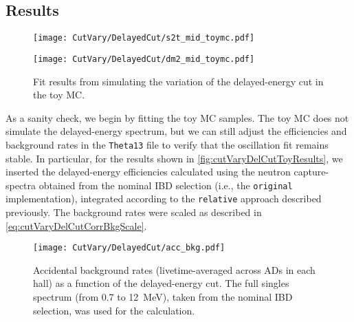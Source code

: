 \documentclass[../thesis.tex]{subfiles}
\begin{document}
\begin{comment}
In most of the results that follow, we show the outcome of using the \texttt{original} method, but the other methods give the same results. When we later discuss the application of vertex cuts, we will switch to the \texttt{add-then-calc} method (and will show the difficulties that result when attempting to use the \texttt{original} method).
\end{comment}

\subsection{Results}
\label{sec:cutVaryDelCutResults}

\begin{figure}[ht]
  \begin{minipage}{0.5\linewidth}%
    \texttt{[image: CutVary/DelayedCut/s2t\_mid\_toymc.pdf]}%
  \end{minipage}%
  \begin{minipage}{0.5\linewidth}%
    \texttt{[image: CutVary/DelayedCut/dm2\_mid\_toymc.pdf]}%
  \end{minipage}%
  \caption{Fit results from simulating the variation of the delayed-energy cut in the toy MC.}
  \label{fig:cutVaryDelCutToyResults}
\end{figure}

As a sanity check, we begin by fitting the toy MC samples. The toy MC does not simulate the delayed-energy spectrum, but we can still adjust the efficiencies and background rates in the \texttt{Theta13} file to verify that the oscillation fit remains stable. In particular, for the results shown in \autoref{fig:cutVaryDelCutToyResults}, we inserted the delayed-energy efficiencies calculated using the neutron capture-spectra obtained from the nominal IBD selection (i.e., the \texttt{original} implementation), integrated according to the \texttt{relative} approach described previously.
The background rates were scaled as described in \autoref{eq:cutVaryDelCutCorrBkgScale}.

\begin{figure}[ht]
  \texttt{[image: CutVary/DelayedCut/acc\_bkg.pdf]}
  \caption{Accidental background rates (livetime-averaged across ADs in each hall) as a function of the delayed-energy cut. The full singles spectrum (from 0.7 to 12~MeV), taken from the nominal IBD selection, was used for the calculation.}
  \label{fig:cutVaryDelCutAccBkg}
\end{figure}
\end{document}
